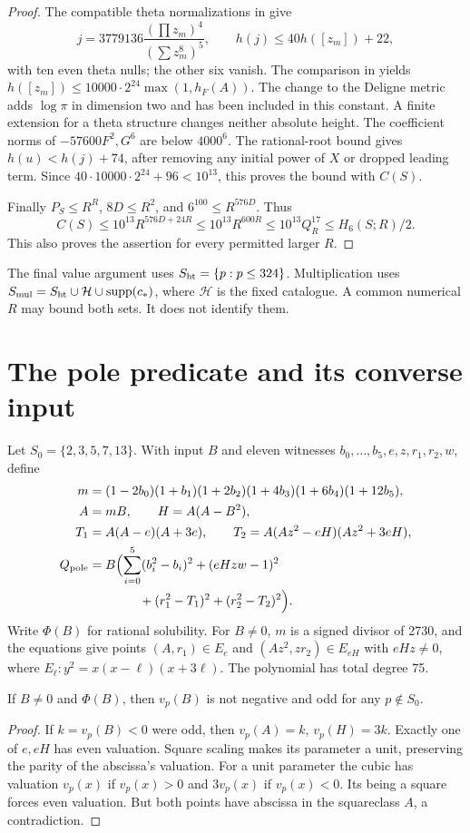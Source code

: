 \begin{proof}
The compatible theta normalizations in \cite{linyang,lny} give
\[
 j=3779136\frac{(\prod z_m)^4}{(\sum z_m^8)^5},\qquad
 h(j)\le40h([z_m])+22,
\]
with ten even theta nulls; the other six vanish. The comparison in
\cite[Corollary 1.3(2)]{pazuki} yields
$h([z_m])\le10000\cdot2^{24}\max(1,h_F(A))$.
The change to the Deligne metric adds $\log\pi$ in dimension two and
has been included in this constant. A finite extension for a theta
structure changes neither absolute height. The coefficient norms of
$-57600F^2,G^6$ are below $4000^6$. The rational-root bound gives
$h(u)<h(j)+74$, after removing any initial power of $X$ or dropped
leading term. Since $40\cdot10000\cdot2^{24}+96<10^{13}$, this proves
the bound with $C(S)$.

Finally $P_S\le R^R$, $8D\le R^2$, and $6^{100}\le R^{576D}$.
Thus
\[
 C(S)\le10^{13}R^{576D+24R}\le10^{13}R^{600R}
 \le10^{13}Q_R^{17}\le H_6(S;R)/2.
\]
This also proves the assertion for every permitted larger $R$.
\end{proof}

The final value argument uses $S_{\rm ht}=\{p:p\le324\}$. Multiplication
uses $S_{\rm mul}=S_{\rm ht}\cup\mathcal H\cup\operatorname{supp}(c_*)$,
where $\mathcal H$ is the fixed catalogue. A common numerical $R$ may
bound both sets. It does not identify them.

\section{The pole predicate and its converse input}\label{sec:pole}
Let $S_0=\{2,3,5,7,13\}$. With input $B$ and eleven witnesses
$b_0,\ldots,b_5,e,z,r_1,r_2,w$, define
\begin{align*}
 m&=(1-2b_0)(1+b_1)(1+2b_2)(1+4b_3)(1+6b_4)(1+12b_5),\\
 A&=mB,\qquad H=A(A-B^2),\\
 T_1&=A(A-e)(A+3e),\qquad T_2=A(Az^2-eH)(Az^2+3eH),\\
 Q_{\rm pole}&=B\Bigl(\sum_{i=0}^5(b_i^2-b_i)^2+(eHzw-1)^2\\
 &\hspace{4em}+(r_1^2-T_1)^2+(r_2^2-T_2)^2\Bigr).
\end{align*}
Write $\Phi(B)$ for rational solubility. For $B\ne0$, $m$ is a signed
divisor of 2730, and the equations give points $(A,r_1)\in E_e$ and
$(Az^2,zr_2)\in E_{eH}$ with $eHz\ne0$, where
$E_\ell:y^2=x(x-\ell)(x+3\ell)$. The polynomial has total degree 75.

\begin{lemma}\label{lem:pole}
If $B\ne0$ and $\Phi(B)$, then $v_p(B)$ is not negative and odd for
any $p\notin S_0$.
\end{lemma}
\begin{proof}
If $k=v_p(B)<0$ were odd, then $v_p(A)=k$, $v_p(H)=3k$.
Exactly one of $e,eH$ has even valuation. Square scaling makes its
parameter a unit, preserving the parity of the abscissa's valuation.
For a unit parameter the cubic has valuation $v_p(x)$ if $v_p(x)>0$
and $3v_p(x)$ if $v_p(x)<0$. Its being a square forces even valuation.
But both points have abscissa in the squareclass $A$, a contradiction.
\end{proof}

